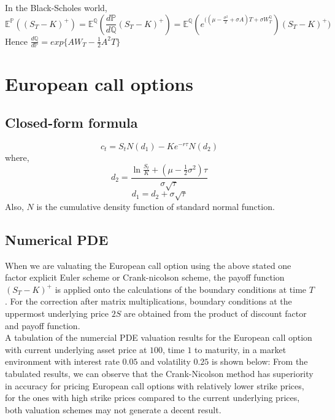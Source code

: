 In the Black-Scholes world,
$$\mathbb{E}^{\mathbb{P}}((S_{T} - K)^{+})= \mathbb{E}^{\mathbb{Q}}(\frac{d\mathbb{P}}{d\mathbb{Q}}(S_{T} - K)^{+}) = \mathbb{E}^{\mathbb{Q}}(e^{((\mu - \frac{\sigma^{2}}{2}+\sigma A)T + \sigma W_{T}^{\mathbb{Q}}})(S_{T} - K)^{+})$$
Hence $\displaystyle \frac{d\mathbb{Q}}{d\mathbb{P}} = exp\{AW_{T} - \frac{1}{2}A^{2}T\}$

\section*{European call options}
\subsection*{Closed-form formula}
$$c_{t} = S_{t} N(d_{1}) - Ke^{-r\tau} N(d_{2})$$
where,
$$d_{2} = \frac{\ln{\frac{S_{t}}{K}} + (\mu - \frac{1}{2}\sigma^{2})\tau}{\sigma\sqrt{\tau}}$$
$$d_{1} = d_{2} + \sigma\sqrt{\tau}$$
Also, $N$ is the cumulative density function of standard normal function.

\subsection*{Numerical PDE}
When we are valuating the European call option using the above stated one factor explicit Euler scheme or Crank-nicolson scheme, the payoff function $(S_{T} - K)^{+}$ is applied onto the calculations of the boundary conditions at time $T$. For the correction after matrix multiplications, boundary conditions at the uppermost underlying price $2S$ are obtained from the product of discount factor and payoff function.\\[1mm]
A tabulation of the numercial PDE valuation results for the European call option with current underlying asset price at $100$, time $1$ to maturity, in a market environment with interest rate $0.05$ and volatility $0.25$ is shown below:
From the tabulated results, we can observe that the Crank-Nicolson method has superiority in accuracy for pricing European call options with relatively lower strike prices, for the ones with high strike prices compared to the current underlying prices, both valuation schemes may not generate a decent result.

